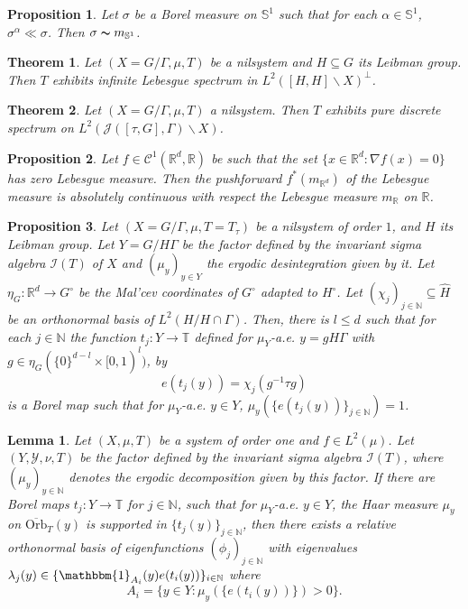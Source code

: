 \documentclass[10pt,a4paper]{amsart}
\newtheorem{theorem}{Theorem}
\newtheorem{proposition}{Proposition}
\newtheorem{lemma}{Lemma}
\newcommand{\N}{\mathbb{N}}
\newcommand{\R}{\mathbb{R}}
\newcommand{\T}{\mathbb{T}}
\newcommand{\bS}{\mathbb{S}}
\newcommand{\ind}[1]{\mathbbm{1}_{#1}}
\begin{document}
\begin{proposition}\label{Lemma-measure-in-circle}
    Let $\sigma$ be a Borel measure on $\bS^1$ such that for each $\alpha\in \bS^1$, $\sigma^\alpha\ll \sigma$. Then $\sigma\thicksim m_{\bS^1}$.
\end{proposition}

\begin{theorem}\label{Spectrum-uniform-part}
    Let $(X=G/\Gamma,\mu,T)$ be a nilsystem and $H\subseteq G$ its Leibman group. Then $T$ exhibits infinite Lebesgue spectrum in $L^2([H,H] \backslash X)^\perp$.
\end{theorem}

\begin{theorem}\label{main-theorem}
    Let $(X=G/\Gamma,\mu,T)$ a nilsystem. Then $T$ exhibits pure discrete spectrum on $L^2(\mathcal{J}([\tau,G],\Gamma)\backslash X)$. 
\end{theorem}

\begin{proposition}\label{app-coarea-formula}
    Let $f\in \mathcal{C}^1(\R^d,\R)$ be such that the set $\{x\in \R^d : \nabla f (x)=0\}$ has zero Lebesgue measure. Then the pushforward $f^*(m_{\R^d})$ of the Lebesgue measure is absolutely continuous with respect the Lebesgue measure $m_{\R}$ on $\R$.
\end{proposition}

\begin{proposition}\label{tj-explicit}
    Let $(X=G/\Gamma,\mu,T=T_\tau)$ be a nilsystem of order $1$, and $H$ its Leibman group. Let $Y=G/H\Gamma$ be the factor defined by the invariant sigma algebra $\mathcal{I}(T)$ of $X$ and $(\mu_y)_{y\in Y}$ the ergodic desintegration given by it. Let $\eta_{G}: \R^d \to G^\circ$ be the Mal'cev coordinates of $G^\circ$ adapted to $H^\circ$. Let $(\chi_j)_{j\in \N}\subseteq \widehat{H}$ be an orthonormal basis of $L^2(H/H\cap \Gamma)$. Then, there is $l\leq d$ such that for each $j\in \N$ the function $t_j:Y\to \T$ defined for $\mu_Y$-a.e. $y=gH\Gamma$ with $g\in \eta_G(\{0\}^{d-l}\times [0,1)^l)$, by $$e(t_j(y))= \chi_j(g^{-1}\tau g)$$
    is a Borel map such that  for $\mu_Y$-a.e. $y\in Y$, $\mu_y(\{e(t_j(y))\}_{j\in \N})=1$. 
\end{proposition}

\begin{lemma}\label{relative-basis}
    Let $(X,\mu,T)$ be a system of order one and $f\in L^2(\mu)$. Let $(Y,\mathcal{Y},\nu,T)$ be the factor defined by the invariant sigma algebra $\mathcal{I}(T)$, where $(\mu_y)_{y\in \N}$ denotes the ergodic decomposition given by this factor. If there are Borel maps $t_j:Y\to \T$ for $j\in \N$, such that for $\mu_Y$-a.e. $y\in Y$, the Haar measure $\mu_y$ on $\overline{\mathrm{Orb}}_{T}(y)$ is supported in $\{t_j(y)\}_{j\in \N}$, then there exists a relative orthonormal basis of eigenfunctions $(\phi_j)_{j\in\N}$ with eigenvalues $\lambda_j(y) \in\{\ind{A_i}(y) e(t_i(y))\}_{i\in \N}$ where 
    $$A_i=\{y\in Y : \mu_y(\{e(t_i(y))\})>0 \}. $$
\end{lemma}
\end{document}
